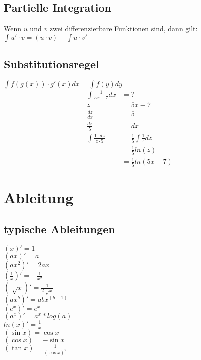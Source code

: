 \documentclass[a4paper, landscape, 10pt]{article}
\begin{document}
\begin{multicols}{5}
\begin{small}
        \subsection{Partielle Integration}
        Wenn $u$ und $v$ zwei differenzierbare Funktionen sind, dann gilt: \\
        $\int u' \cdot v = (u \cdot v) - \int u \cdot v'$
        \subsection{Substitutionsregel}
        $\int f(g(x)) \cdot g'(x) dx = \int f(y) dy$
        \begin{align*}
            \int \frac{1}{5x - 7} dx &= ?\\
            z &= 5x - 7 \\
            \frac{dz}{dx} &= 5 \\   
            \frac{dz}{5} &= dx  \\
            \int \frac{1 \cdot dz}{z \cdot 5} &= \frac{1}{5} \int \frac{1}{z} dz \\
                                      &= \frac{1}{5} ln(z) \\
                                      &= \frac{1}{5} ln(5x-7)
        \end{align*}
    \section{Ableitung}
		\subsection{typische Ableitungen}
			\begin{multicols}{2}		
				$(x)' = 1$ \\
				$(ax)' = a$ \\
				$(ax^2)' = 2ax$ \\
				$(\frac{1}{x})' = -\frac{1}{x^2}$ \\
				$(\sqrt[]{x})' = \frac{1}{2\sqrt[]{x}}$ \\
				$(ax^b)' = abx^(b-1)$ \\
				$(e^x)' = e^x $ \\
				$(a^x)' = a^x*log(a) $ \\
				$ln(x)' = \frac{1}{x}$ \\
				$(\sin x) = \cos x$ \\
				$(\cos x) = -\sin x$ \\
				$(\tan x) = \frac{1}{(\cos x)^2}$ \\ 
			\end{multicols}

\end{small}
\end{multicols}
\end{document}
